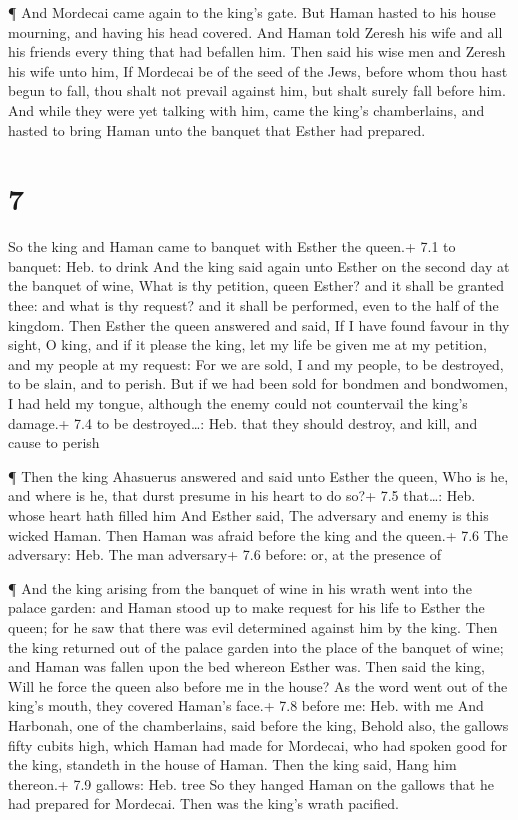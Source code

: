  ¶ And Mordecai came again to the king's gate. But Haman
hasted to his house mourning, and having his head covered. 
And Haman told Zeresh his wife and all his friends every thing that had
befallen him. Then said his wise men and Zeresh his wife unto him, If
Mordecai be of the seed of the Jews, before whom thou hast begun to
fall, thou shalt not prevail against him, but shalt surely fall before
him.  And while they were yet talking with him, came the
king's chamberlains, and hasted to bring Haman unto the banquet that
Esther had prepared.

\hypertarget{section-6}{%
\section{7}\label{section-6}}

 So the king and Haman came to banquet with Esther the
queen.+ 7.1 to banquet: Heb. to drink  And the king said
again unto Esther on the second day at the banquet of wine, What is thy
petition, queen Esther? and it shall be granted thee: and what is thy
request? and it shall be performed, even to the half of the kingdom.
 Then Esther the queen answered and said, If I have found
favour in thy sight, O king, and if it please the king, let my life be
given me at my petition, and my people at my request:  For
we are sold, I and my people, to be destroyed, to be slain, and to
perish. But if we had been sold for bondmen and bondwomen, I had held my
tongue, although the enemy could not countervail the king's damage.+ 7.4
to be destroyed\ldots: Heb. that they should destroy, and kill, and
cause to perish

 ¶ Then the king Ahasuerus answered and said unto Esther the
queen, Who is he, and where is he, that durst presume in his heart to do
so?+ 7.5 that\ldots: Heb. whose heart hath filled him  And
Esther said, The adversary and enemy is this wicked Haman. Then Haman
was afraid before the king and the queen.+ 7.6 The adversary: Heb. The
man adversary+ 7.6 before: or, at the presence of

 ¶ And the king arising from the banquet of wine in his
wrath went into the palace garden: and Haman stood up to make request
for his life to Esther the queen; for he saw that there was evil
determined against him by the king.  Then the king returned
out of the palace garden into the place of the banquet of wine; and
Haman was fallen upon the bed whereon Esther was. Then said the king,
Will he force the queen also before me in the house? As the word went
out of the king's mouth, they covered Haman's face.+ 7.8 before me: Heb.
with me  And Harbonah, one of the chamberlains, said before
the king, Behold also, the gallows fifty cubits high, which Haman had
made for Mordecai, who had spoken good for the king, standeth in the
house of Haman. Then the king said, Hang him thereon.+ 7.9 gallows: Heb.
tree  So they hanged Haman on the gallows that he had
prepared for Mordecai. Then was the king's wrath pacified.

